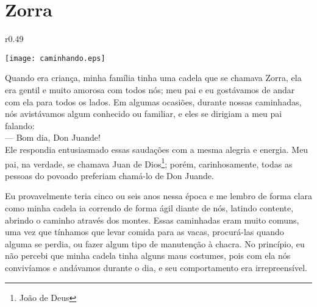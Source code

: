 \cleardoublepage
\newpage
\ifdefined\EnableIncludeImages
\fi
\chapter{Zorra}


\ifdefined\EnableIncludeImages
\begin{wrapfigure}{r}{0.49\textwidth}
  \begin{center}
  \vspace{-30pt}
    \texttt{[image: caminhando.eps]}
  \end{center}
  \vspace{-20pt}
\end{wrapfigure}
\fi
Quando era criança, minha família tinha uma cadela que se chamava Zorra, ela era gentil e muito amorosa com todos nós; meu pai e eu gostávamos de andar com ela para todos os lados. Em algumas ocasiões, durante nossas caminhadas, nós avistávamos algum conhecido ou familiar, e eles se dirigiam a meu pai falando:\\\indent 
--- Bom dia, Don Juande!\\\indent
Ele respondia entusiasmado essas saudações com a mesma alegria e energia.
Meu pai, na verdade, se chamava Juan de Dios\footnote{João de Deus}; porém, carinhosamente, todas as pessoas do povoado preferiam chamá-lo de Don Juande.

Eu provavelmente teria cinco ou seis anos nessa época e me lembro de forma clara como minha cadela ia correndo de forma ágil diante de nós, latindo contente, abrindo o caminho através dos montes.
Essas caminhadas eram muito comuns, uma vez que tínhamos que levar comida para as vacas, procurá-las quando alguma se perdia, ou fazer algum tipo de manutenção à chacra.
No princípio, eu não percebi que minha cadela tinha alguns maus costumes, pois com ela nós convivíamos e andávamos durante o dia, e seu comportamento era irrepreensível. 

